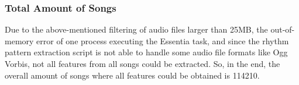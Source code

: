 \subsubsection{Total Amount of Songs}\label{totamsong}

Due to the above-mentioned filtering of audio files larger than 25MB, the out-of-memory error of one process executing the Essentia task, and since the rhythm pattern extraction script is not able to handle some audio file formats like Ogg Vorbis, not all features from all songs could be extracted. So, in the end, the overall amount of songs where all features could be obtained is 114210.\\


